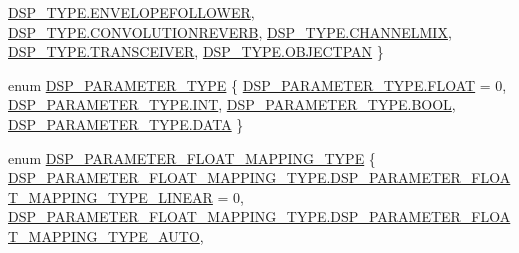 \begin{DoxyCompactItemize}
\hyperlink{namespace_f_m_o_d_abfbbfe13740257430ae8350c2456b0ffaa1964de419d5535d21eccd4ec5eb21e8}{D\+S\+P\+\_\+\+T\+Y\+P\+E.\+E\+N\+V\+E\+L\+O\+P\+E\+F\+O\+L\+L\+O\+W\+ER}, 
\newline
\hyperlink{namespace_f_m_o_d_abfbbfe13740257430ae8350c2456b0ffa21c2b1b77e5f74d828b893fa8ac70961}{D\+S\+P\+\_\+\+T\+Y\+P\+E.\+C\+O\+N\+V\+O\+L\+U\+T\+I\+O\+N\+R\+E\+V\+E\+RB}, 
\hyperlink{namespace_f_m_o_d_abfbbfe13740257430ae8350c2456b0ffa2be2d12ed07af2d61408e7ce8fde9ff2}{D\+S\+P\+\_\+\+T\+Y\+P\+E.\+C\+H\+A\+N\+N\+E\+L\+M\+IX}, 
\hyperlink{namespace_f_m_o_d_abfbbfe13740257430ae8350c2456b0ffae3481477c366e2e6792b51badcbc4d1b}{D\+S\+P\+\_\+\+T\+Y\+P\+E.\+T\+R\+A\+N\+S\+C\+E\+I\+V\+ER}, 
\hyperlink{namespace_f_m_o_d_abfbbfe13740257430ae8350c2456b0ffafed081acab46f830cb41a949672d5839}{D\+S\+P\+\_\+\+T\+Y\+P\+E.\+O\+B\+J\+E\+C\+T\+P\+AN}
 \}
\item 
enum \hyperlink{namespace_f_m_o_d_a294ea0e9a51b5afad5638478a72aa712}{D\+S\+P\+\_\+\+P\+A\+R\+A\+M\+E\+T\+E\+R\+\_\+\+T\+Y\+PE} \{ \hyperlink{namespace_f_m_o_d_a294ea0e9a51b5afad5638478a72aa712ae738c26bf4ce1037fa81b039a915cbf6}{D\+S\+P\+\_\+\+P\+A\+R\+A\+M\+E\+T\+E\+R\+\_\+\+T\+Y\+P\+E.\+F\+L\+O\+AT} = 0, 
\hyperlink{namespace_f_m_o_d_a294ea0e9a51b5afad5638478a72aa712a53f93baa3057821107c750323892fa92}{D\+S\+P\+\_\+\+P\+A\+R\+A\+M\+E\+T\+E\+R\+\_\+\+T\+Y\+P\+E.\+I\+NT}, 
\hyperlink{namespace_f_m_o_d_a294ea0e9a51b5afad5638478a72aa712aa97b2c144243b2b9d2c593ec268b62f5}{D\+S\+P\+\_\+\+P\+A\+R\+A\+M\+E\+T\+E\+R\+\_\+\+T\+Y\+P\+E.\+B\+O\+OL}, 
\hyperlink{namespace_f_m_o_d_a294ea0e9a51b5afad5638478a72aa712ae44f9e348e41cb272efa87387728571b}{D\+S\+P\+\_\+\+P\+A\+R\+A\+M\+E\+T\+E\+R\+\_\+\+T\+Y\+P\+E.\+D\+A\+TA}
 \}
\item 
enum \hyperlink{namespace_f_m_o_d_afd26b4f5904412578911d16a5d3d904f}{D\+S\+P\+\_\+\+P\+A\+R\+A\+M\+E\+T\+E\+R\+\_\+\+F\+L\+O\+A\+T\+\_\+\+M\+A\+P\+P\+I\+N\+G\+\_\+\+T\+Y\+PE} \{ \hyperlink{namespace_f_m_o_d_afd26b4f5904412578911d16a5d3d904fa12afec3c040e4f8a3b83c4014a060c3f}{D\+S\+P\+\_\+\+P\+A\+R\+A\+M\+E\+T\+E\+R\+\_\+\+F\+L\+O\+A\+T\+\_\+\+M\+A\+P\+P\+I\+N\+G\+\_\+\+T\+Y\+P\+E.\+D\+S\+P\+\_\+\+P\+A\+R\+A\+M\+E\+T\+E\+R\+\_\+\+F\+L\+O\+A\+T\+\_\+\+M\+A\+P\+P\+I\+N\+G\+\_\+\+T\+Y\+P\+E\+\_\+\+L\+I\+N\+E\+AR} = 0, 
\hyperlink{namespace_f_m_o_d_afd26b4f5904412578911d16a5d3d904fa7d508b5eef3e90d54ef862c432241faf}{D\+S\+P\+\_\+\+P\+A\+R\+A\+M\+E\+T\+E\+R\+\_\+\+F\+L\+O\+A\+T\+\_\+\+M\+A\+P\+P\+I\+N\+G\+\_\+\+T\+Y\+P\+E.\+D\+S\+P\+\_\+\+P\+A\+R\+A\+M\+E\+T\+E\+R\+\_\+\+F\+L\+O\+A\+T\+\_\+\+M\+A\+P\+P\+I\+N\+G\+\_\+\+T\+Y\+P\+E\+\_\+\+A\+U\+TO}, 

\end{DoxyCompactItemize}
